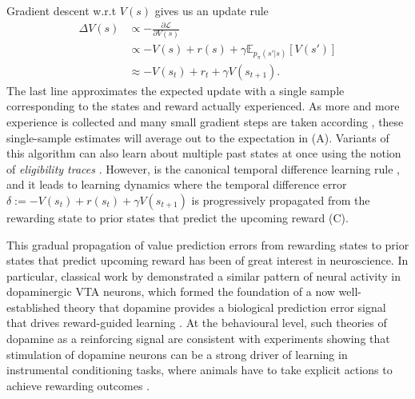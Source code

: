 Gradient descent w.r.t $V(s)$ gives us an update rule
\begin{align}
    \Delta V(s) &\propto - \frac{\partial \mathcal{L}}{\partial V(s)}\\
    \label{eq:TD-learning_exp}
    &\propto - V(s) + r(s) + \gamma \mathbb{E}_{p_\pi(s'|s)} \left [ V(s') \right ]\\
    \label{eq:TD-learning}
    &\approx - V(s_t) + r_t + \gamma V(s_{t+1}).
\end{align}
The last line approximates the expected update with a single sample corresponding to the states and reward actually experienced.
As more and more experience is collected and many small gradient steps are taken according , these single-sample estimates will average out to the expectation in  (A).
Variants of this algorithm can also learn about multiple past states at once using the notion of \emph{eligibility traces} \citep{sutton2018reinforcement}.
However,  is the canonical temporal difference learning rule \citep{sutton1988learning}, and it leads to learning dynamics where the temporal difference error $\delta := - V(s_t) + r(s_t) + \gamma V(s_{t+1})$ is progressively propagated from the rewarding state to prior states that predict the upcoming reward (C).

This gradual propagation of value prediction errors from rewarding states to prior states that predict upcoming reward has been of great interest in neuroscience.
In particular, classical work by \citet{schultz1997neural} demonstrated a similar pattern of neural activity in dopaminergic VTA neurons, which formed the foundation of a now well-established theory that dopamine provides a biological prediction error signal that drives reward-guided learning \citep{niv2009reinforcement}.
At the behavioural level, such theories of dopamine as a reinforcing signal are consistent with experiments showing that stimulation of dopamine neurons can be a strong driver of learning in instrumental conditioning tasks, where animals have to take explicit actions to achieve rewarding outcomes \citep{olds1954positive, tsai2009phasic}.



